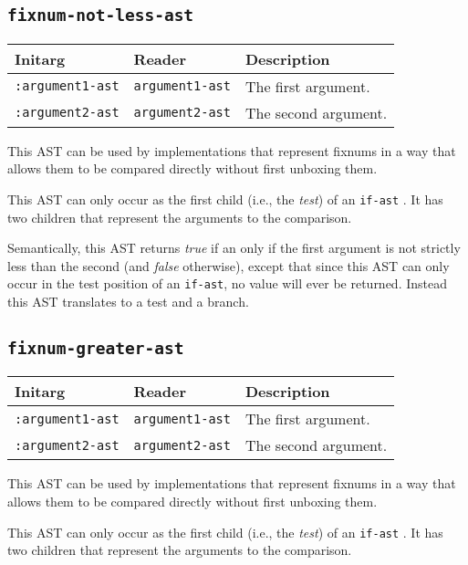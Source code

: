\subsection{\texttt{fixnum-not-less-ast}}
\label{fixnum-not-less-ast}

\begin{tabular}{|l|l|l|}
\hline
Initarg & Reader & Description\\
\hline\hline
\texttt{:argument1-ast} & \texttt{argument1-ast} & The first argument.\\
\hline
\texttt{:argument2-ast} & \texttt{argument2-ast} & The second argument.\\
\hline
\end{tabular}

This AST can be used by implementations that represent fixnums in a
way that allows them to be compared directly without first unboxing
them.

This AST can only occur as the first child (i.e., the \emph{test}) of
an \texttt{if-ast} .  It has two children that
represent the arguments to the comparison.  

Semantically, this AST returns \emph{true} if an only if the first
argument is not strictly less than the second (and \emph{false}
otherwise), except that since this AST can only occur in the test
position of an \texttt{if-ast}, no value will ever be returned.
Instead this AST translates to a test and a branch. 

\subsection{\texttt{fixnum-greater-ast}}
\label{fixnum-greater-ast}

\begin{tabular}{|l|l|l|}
\hline
Initarg & Reader & Description\\
\hline\hline
\texttt{:argument1-ast} & \texttt{argument1-ast} & The first argument.\\
\hline
\texttt{:argument2-ast} & \texttt{argument2-ast} & The second argument.\\
\hline
\end{tabular}

This AST can be used by implementations that represent fixnums in a
way that allows them to be compared directly without first unboxing
them.

This AST can only occur as the first child (i.e., the \emph{test}) of
an \texttt{if-ast} .  It has two children that
represent the arguments to the comparison.  

